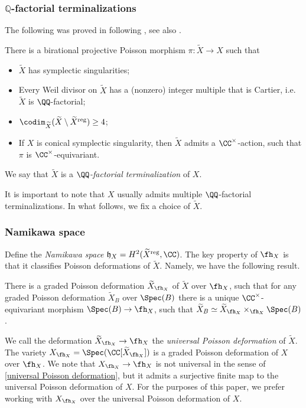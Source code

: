 \documentclass[12pt]{amsart}
\begin{document}
   \subsubsection{$\mathbb{Q}$-factorial terminalizations}     The following was proved in \cite[Prop 2.1]{LosevSRA} following \cite{BCHM}, see also \cite[A.7]{Namikawa3}. 
        \begin{prop}
            There is a birational projective Poisson morphism $\pi\colon \widetilde{X}\to X$ such that
            \begin{itemize}
                \item[(i)] $\widetilde{X}$ has symplectic singularities;
                \item[(ii)] Every Weil divisor on $\widetilde{X}$ has a (nonzero) integer multiple that is Cartier, i.e. $\widetilde{X}$ is $\QQ$-factorial;
                \item[(iii)] $\codim_{\widetilde{X}}(\widetilde{X}\setminus \widetilde{X}^{\mathrm{reg}})\ge 4$;
                \item[(iv)] If $X$ is conical symplectic singularity, then $\widetilde{X}$ admits a $\CC^\times$-action, such that $\pi$ is $\CC^\times$-equivariant. 
            \end{itemize}

             We say that $\widetilde{X}$ is a \emph{$\QQ$-factorial terminalization} of $X$.
        \end{prop}

        It is important to note that $X$ usually admits multiple $\QQ$-factorial terminalizations. In what follows, we fix a choice of $\widetilde{X}$. 
        
\subsubsection{Namikawa space}        
        Define the \emph{Namikawa space} $\mathfrak{h}_X=H^2(\widetilde{X}^{\mathrm{reg}}, \CC)$. The key property of $\fh_X$ is that it classifies Poisson deformations of $\widetilde{X}$. Namely, we have the following result.
        \begin{prop}\label{universal Poisson deformation}\cite[Proposition 2.6]{Losev4}
            There is a graded Poisson deformation $\widetilde{X}_{\fh_X}$ of $\widetilde{X}$ over $\fh_X$, such that for any graded Poisson deformation $\widetilde{X}_B$ over $\Spec(B)$ there is a unique $\CC^\times$-equivariant morphism  $\Spec(B)\to \fh_X$, such that $\widetilde{X}_B\simeq \widetilde{X}_{\fh_X}\times_{\fh_X}\Spec(B)$.
        \end{prop}
        We call the deformation $\widetilde{X}_{\fh_X}\to \fh_X$ the \emph{universal Poisson deformation} of $\widetilde{X}$. The variety $X_{\fh_X}=\Spec(\CC[\widetilde{X}_{\fh_X}])$ is a graded Poisson deformation of $X$ over $\fh_X$. We note that $X_{\fh_X}\to \fh_X$ is not universal in the sense of \cref{universal Poisson deformation}, but it admits a surjective finite map to the universal Poisson deformation of $X$. For the purposes of this paper, we prefer working with $X_{\fh_X}$ over the universal Poisson deformation of $X$.
\end{document}

